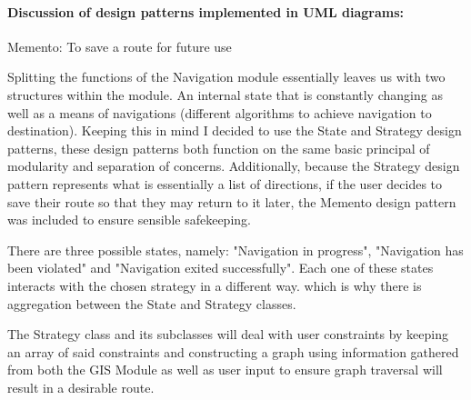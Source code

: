 \documentclass[a4paper,12pt]{article}
\begin{document}
	\paragraph{Discussion of design patterns implemented in UML diagrams:}
		Memento: To save a route for future use
		
		Splitting the functions of the Navigation module essentially leaves us with two structures within the module. An internal state that is constantly changing as well as a means of navigations (different algorithms to achieve navigation to destination). Keeping this in mind I decided to use the State and Strategy design patterns, these design patterns both function on the same basic principal of modularity and separation of concerns. Additionally, because the Strategy design pattern represents what is essentially a list of directions, if the user decides to save their route so that they may return to it later, the Memento design pattern was included to ensure sensible safekeeping.
		
		There are three possible states, namely: "Navigation in progress", "Navigation has been violated" and "Navigation exited successfully". Each one of these states interacts with the chosen strategy in a different way. which is why there is aggregation between the State and Strategy classes.
		
		The Strategy class and its subclasses will deal with user constraints by keeping an array of said constraints and constructing a graph using information gathered from both the GIS Module as well as user input to ensure graph traversal will result in a desirable route. 
	
\end{document}
